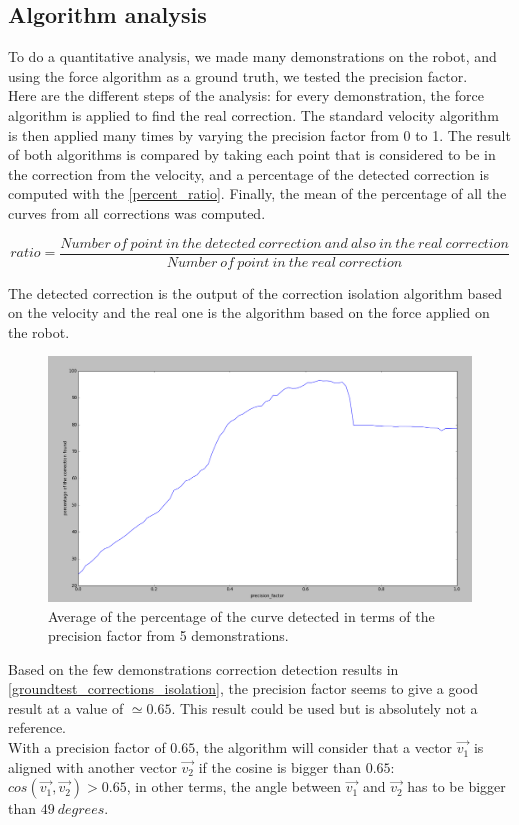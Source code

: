 \clearpage
\subsection{Algorithm analysis}

To do a quantitative analysis, we made many demonstrations on the robot, and using the force algorithm as a ground truth, we tested the precision factor.\\

Here are the different steps of the analysis: for every demonstration, the force algorithm is applied to find the real correction. The standard velocity algorithm is then applied many times by varying the precision factor from 0 to 1. The result of both algorithms is compared by taking each point that is considered to be in the correction from the velocity, and a percentage of the detected correction is computed with the \autoref{percent_ratio}. Finally, the mean of the percentage of all the curves from all corrections was computed.

\begin{equation}
\label{percent_ratio}
ratio = \frac{Number\ of\ point\ in\ the\ detected\ correction\ and\ also\ in\ the\ real\ correction}{Number\ of\ point\ in\ the\ real\ correction}
\end{equation}

The detected correction is the output of the correction isolation algorithm based on the velocity and the real one is the algorithm based on the force applied on the robot.

\begin{figure}[H]
\centering
\includegraphics[width=15cm]{img/analysis_algo_iso.png}
\caption{Average of the percentage of the curve detected in terms of the precision factor from 5 demonstrations.}
\label{groundtest_corrections_isolation}
\end{figure}

Based on the few demonstrations correction detection results in \autoref{groundtest_corrections_isolation}, the precision factor seems to give a good result at a value of $\simeq 0.65$.
This result could be used but is absolutely not a reference. \\

With a precision factor of $0.65$, the algorithm will consider that a vector $\vec{v_1}$ is aligned with another vector $\vec{v_2}$ if the cosine is bigger than $0.65$: $cos(\vec{v_1}, \vec{v_2})>0.65$, in other terms, the angle between $\vec{v_1}$ and $\vec{v_2}$ has to be bigger than $49\ degrees$.
